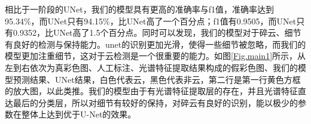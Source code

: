 \documentclass[10pt]{ctexart}
\begin{document}
\begin{multicols}{2}

相比于一阶段的UNet，我们的模型具有更高的准确率与f1值，准确率达到95.34\%，而UNet只有94.15\%，比UNet高了一个百分点；f1值有0.9505，而UNet只有0.9352，比UNet高了1.5个百分点。同时可以发现，我们的模型对于碎云、细节有良好的检测与保持能力。unet的识别更加光滑，使得一些细节被忽略，而我们的模型更加注重细节，这对于云检测是一个很重要的能力。如图\ref{Fig.main1}所示，从左到右依次为真彩色图、人工标注、光谱特征提取结果构成的假彩色图、我们的模型预测结果、UNet结果，白色代表云，黑色代表非云，第二行是第一行黄色方框的放大图，以此类推。我们的模型由于有光谱特征提取层的存在，并且光谱特征直达最后的分类层，所以对细节有较好的保持，对碎云有良好的识别，能以极少的参数在整体上达到优于U-Net的效果。

\begin{figure}[H]
    \centering
\end{figure}
\end{multicols}
\end{document}
